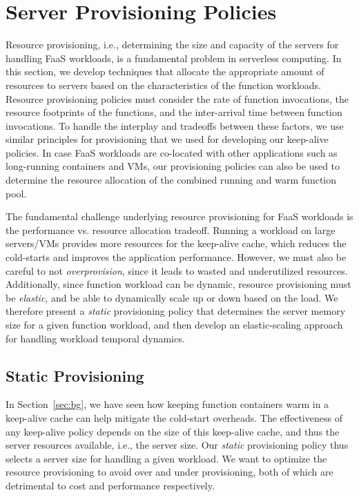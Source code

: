 \section{Server Provisioning Policies} %
\label{sec:provision}
\vspace*{\subsecspace}

Resource provisioning, i.e., determining the size and capacity of the servers for handling FaaS workloads, is a fundamental problem in serverless computing. 
In this section, we develop techniques that allocate the appropriate amount of resources to servers based on the characteristics of the function workloads. 
Resource provisioning policies must consider the rate of function invocations, the resource footprints of the functions, and the inter-arrival time between function invocations. 
To handle the interplay and tradeoffs between these factors, we use similar principles for provisioning that we used for developing our keep-alive policies. 
In case FaaS workloads are co-located with other applications such as long-running containers and VMs, our provisioning policies can also be used to determine the resource allocation of the combined running and warm function pool. 

The fundamental challenge underlying resource provisioning for FaaS workloads is the performance vs. resource allocation tradeoff. 
Running a workload on large servers/VMs provides more resources for the keep-alive cache, which reduces the cold-starts and improves the application performance. 
However, we must also be careful to not \emph{overprovision}, since it leads to wasted and underutilized resources.
Additionally, since function workload can be dynamic, resource provisioning must be \emph{elastic}, and be able to dynamically scale up or down based on the load. 
We therefore present a \emph{static} provisioning policy that determines the server memory size for a given function workload, and then develop an elastic-scaling approach for handling workload temporal dynamics. 

\subsection{Static Provisioning}
\label{subsec:static}
\vspace*{\subsecspace}

In Section~\ref{sec:bg}, we have seen how keeping function containers warm in a keep-alive cache can help mitigate the cold-start overheads. 
The effectiveness of any keep-alive policy depends on the size of this keep-alive cache, and thus the server resources available, i.e., the server size. 
Our \emph{static} provisioning policy thus selects a server size for handling a given workload. 
We want to optimize the resource provisioning to avoid over and under provisioning, both of which are detrimental to cost and performance respectively. 


